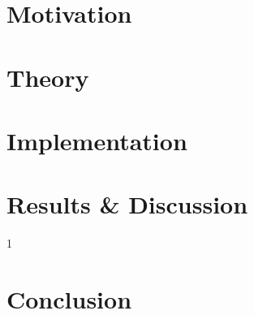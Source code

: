 \documentclass[12pt, twoside,a4paper]{report}
\begin{document}
\tableofcontents

\chapter{Motivation}


\chapter{Theory}


\chapter{Implementation}


\chapter{Results \& Discussion}1


\chapter{Conclusion}



%

\end{document}
